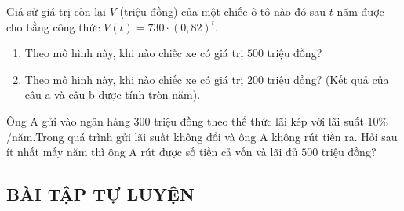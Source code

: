 \begin{vd}%
	Giả sử giá trị còn lại $V$ (triệu đồng) của một chiếc ô tô nào đó sau $t$ năm được cho bằng công thức $V(t)=730 \cdot(0,82)^t$.
	\begin{enumerate}
		\item Theo mô hình này, khi nào chiếc xe có giá trị $500$ triệu đồng?
		\item Theo mô hình này, khi nào chiếc xe có giá trị $200$ triệu đồng?
		(Kết quả của câu a và câu b được tính tròn năm).
	\end{enumerate}
\end{vd} 

\begin{vd}
	Ông A gửi vào ngân hàng $300$ triệu đồng theo thể thức lãi kép với lãi suất $10\%$/năm.Trong quá trình gửi lãi suất không đổi và ông A không rút tiền ra. Hỏi sau ít nhất mấy năm thì ông	A rút được số tiền cả vốn và lãi đủ $500$ triệu đồng?
\end{vd} 

\subsection{BÀI TẬP TỰ LUYỆN}

